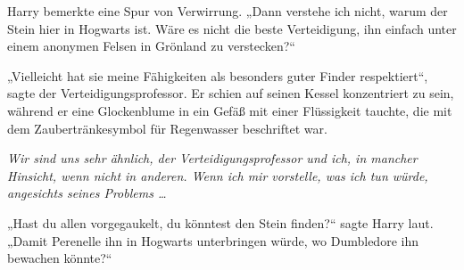Harry bemerkte eine Spur von Verwirrung.
„Dann verstehe ich nicht, warum der Stein hier in Hogwarts ist. Wäre es nicht die beste Verteidigung, ihn einfach unter einem anonymen Felsen in Grönland zu verstecken?“

„Vielleicht hat sie meine Fähigkeiten als besonders guter Finder respektiert“, sagte der Verteidigungsprofessor.
Er schien auf seinen Kessel konzentriert zu sein, während er eine Glockenblume in ein Gefäß mit einer Flüssigkeit tauchte, die mit dem Zaubertränkesymbol für Regenwasser beschriftet war.

\emph{Wir sind uns sehr ähnlich, der Verteidigungsprofessor und ich, in mancher Hinsicht, wenn nicht in anderen. Wenn ich mir vorstelle, was ich tun würde, angesichts seines Problems …}

„Hast du allen vorgegaukelt, du könntest den Stein finden?“ sagte Harry laut.
„Damit Perenelle ihn in Hogwarts unterbringen würde, wo Dumbledore ihn bewachen könnte?“

